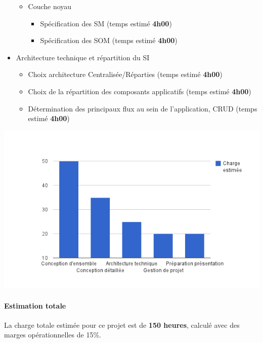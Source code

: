 \begin{itemize}
\begin{itemize}
\item Couche noyau

\begin{itemize}
\item Spécification des SM (temps estimé \textbf{4h00})
\item Spécification des SOM (temps estimé \textbf{4h00})
\end{itemize}

\end{itemize}

\item Architecture technique et répartition du SI

\begin{itemize}
\item Choix architecture Centralisée/Réparties (temps estimé \textbf{4h00})
\item Choix de la répartition des composants applicatifs (temps estimé \textbf{4h00})
\item Détermination des principaux flux au sein de l'application, CRUD (temps estimé \textbf{4h00})
\end{itemize}

\end{itemize}

\begin {center}
\includegraphics[width=\textwidth]{charges-estimees.png}
\end {center}

\paragraph{Estimation totale} La charge totale estimée pour ce projet est de \textbf{150 heures}, calculé avec des marges opérationnelles de 15\%.

